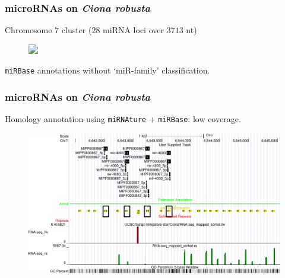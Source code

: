 \begin{frame}[t]
    \frametitle{microRNAs on \textit{Ciona robusta}}
    Chromosome $7$ cluster ($28$ miRNA loci over $3713$ nt)
    \begin{figure}[h!]
        \centering
        \includegraphics<1>[width=\linewidth]{Figures/chr7_cluster} %
    \end{figure}
    \texttt{miRBase} annotations without `miR-family' classification.
\end{frame}

\begin{frame}[t]
    \frametitle{microRNAs on \textit{Ciona robusta}}
    Homology annotation using \texttt{miRNAture} + \texttt{miRBase}: low coverage.
    \begin{figure}[h!]
        \centering
        \includegraphics[width=\linewidth]{Figures/homology_coverage} %
    \end{figure}
\end{frame}
